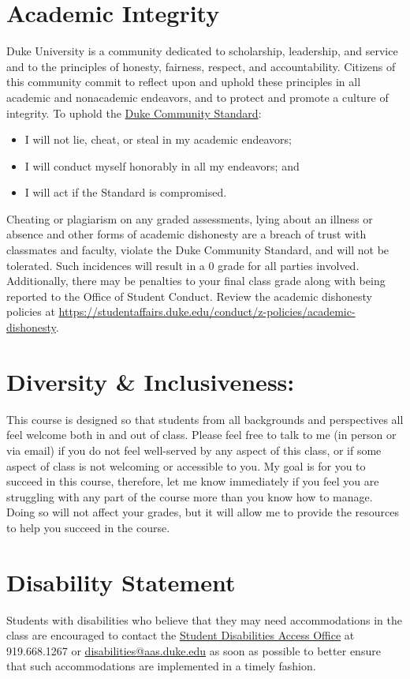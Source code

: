 \documentclass[11pt, a4paper]{article}
\begin{document}
\section{Academic Integrity}  
Duke University is a community dedicated to scholarship, leadership, and service and to the principles of honesty, fairness, respect, and accountability. Citizens of this community commit to reflect upon and uphold these principles in all academic and nonacademic endeavors, and to protect and promote a culture of integrity. To uphold the \href{https://studentaffairs.duke.edu/conduct/about-us/duke-community-standard}{Duke Community Standard}:
\begin{itemize}[label= {\color{darkred}{\Large \HandRight}}]
	\item I will not lie, cheat, or steal in my academic endeavors;
	\item I will conduct myself honorably in all my endeavors; and
	\item I will act if the Standard is compromised.
\end{itemize}

Cheating or plagiarism on any graded assessments, lying about an illness or absence and other forms of academic dishonesty are a breach of trust with classmates and faculty, violate the Duke Community Standard, and will not be tolerated. Such incidences will result in a 0 grade for all parties involved. Additionally, there may be penalties to your final class grade along with being reported to the Office of Student Conduct. Review the academic dishonesty policies at \url{https://studentaffairs.duke.edu/conduct/z-policies/academic-dishonesty}.


\section{Diversity \& Inclusiveness:}
This course is designed so that students from all backgrounds and perspectives all feel welcome both in and out of class. Please feel free to talk to me (in person or via email) if you do not feel well-served by any aspect of this class, or if some aspect of class is not welcoming or accessible to you. My goal is for you to succeed in this course, therefore, let me know immediately if you feel you are struggling with any part of the course more than you know how to manage. Doing so will not affect your grades, but it will allow me to provide the resources to help you succeed in the course.


\section{Disability Statement} 
Students with disabilities who believe that they may need accommodations in the class are encouraged to contact the \href{https://access.duke.edu/students/staff.php}{Student Disabilities Access Office} at 919.668.1267 or \href{mailto:disabilities@aas.duke.edu}{disabilities@aas.duke.edu}  as soon as possible to better ensure that such accommodations are implemented in a timely fashion.
\end{document}
